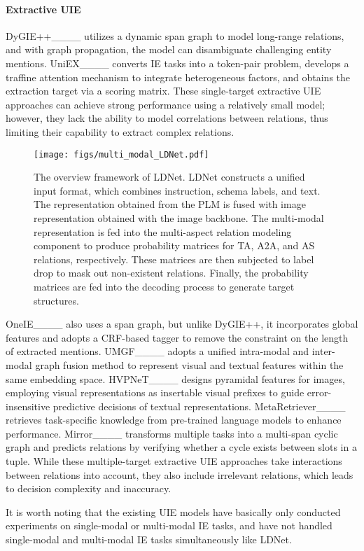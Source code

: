 \paragraph{Extractive UIE} DyGIE++____ utilizes a dynamic span graph to model long-range relations, and with graph propagation, the model can disambiguate challenging entity mentions.
UniEX____ converts IE tasks into a token-pair problem, develops a traffine attention mechanism to integrate heterogeneous factors, and obtains the extraction target via a scoring matrix. These single-target extractive UIE approaches can achieve strong performance using a relatively small model; however, they lack the ability to model correlations between relations, thus limiting their capability to extract complex relations. 
\begin{figure*}[t]
    \centering
\texttt{[image: figs/multi\_modal\_LDNet.pdf]}
    \caption{
         The overview framework of LDNet. LDNet constructs a unified input format, which combines instruction, schema labels, and text. The representation obtained from the PLM is fused with image representation obtained with the image backbone. The multi-modal representation is fed into the multi-aspect relation modeling component to produce probability matrices for TA, A2A, and AS relations, respectively. These matrices are then subjected to label drop to mask out non-existent relations. Finally, the probability matrices are fed into the decoding process to generate target structures.
    }
    \label{fig:model-framework}
\end{figure*}

OneIE____ also uses a span graph, but unlike DyGIE++, it incorporates global features and adopts a CRF-based tagger to remove the constraint on the length of extracted mentions.
UMGF____ adopts a unified intra-modal and inter-modal graph fusion method to represent visual and textual features within the same embedding space.
HVPNeT____ designs pyramidal features for images, employing visual representations as insertable visual prefixes to guide error-insensitive predictive decisions of textual representations. 
MetaRetriever____ retrieves task-specific knowledge from pre-trained language models to enhance performance.
Mirror____ transforms multiple tasks into a multi-span cyclic graph and predicts relations by verifying whether a cycle exists between slots in a tuple. While these multiple-target extractive UIE approaches take interactions between relations into account, they also include irrelevant relations, which leads to decision complexity and inaccuracy.

It is worth noting that the existing UIE models have basically only conducted experiments on single-modal or multi-modal IE tasks, and have not handled single-modal and multi-modal IE tasks simultaneously like LDNet.